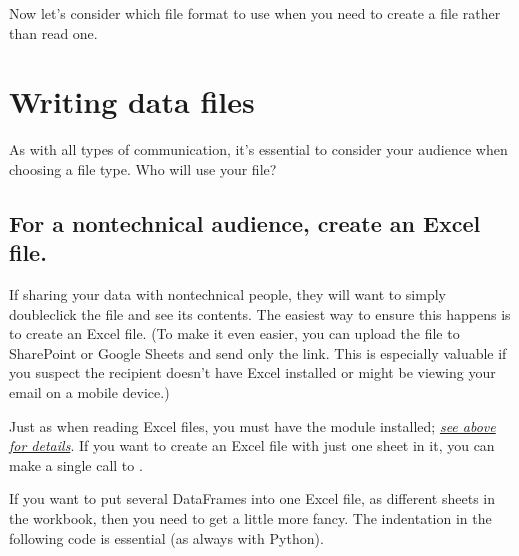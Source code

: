\documentclass[letterpaper,10pt,english]{jupyterBook}
\begin{document}
\sphinxAtStartPar
Now let’s consider which file format to use when you need to create a file rather than read one.


\section{Writing data files}
\label{\detokenize{chapter-13-etl:writing-data-files}}
\sphinxAtStartPar
As with all types of communication, it’s essential to consider your audience when choosing a file type.  Who will use your file?


\subsection{For a nontechnical audience, create an Excel file.}
\label{\detokenize{chapter-13-etl:for-a-nontechnical-audience-create-an-excel-file}}
\sphinxAtStartPar
If sharing your data with non\sphinxhyphen{}technical people, they will want to simply double\sphinxhyphen{}click the file and see its contents.  The easiest way to ensure this happens is to create an Excel file.  (To make it even easier, you can upload the file to SharePoint or Google Sheets and send only the link.  This is especially valuable if you suspect the recipient doesn’t have Excel installed or might be viewing your email on a mobile device.)

\sphinxAtStartPar
Just as when reading Excel files, you must have the  module installed; {\hyperref[\detokenize{chapter-13-etl:pretty-easy-format-to-read-xlsx}]{\emph{see above for details}}}.  If you want to create an Excel file with just one sheet in it, you can make a single call to .

\begin{sphinxVerbatim}[commandchars=\\\{\}]
  
\end{sphinxVerbatim}

\sphinxAtStartPar
If you want to put several DataFrames into one Excel file, as different sheets in the workbook, then you need to get a little more fancy.  The indentation in the following code is essential (as always with Python).
\end{document}
